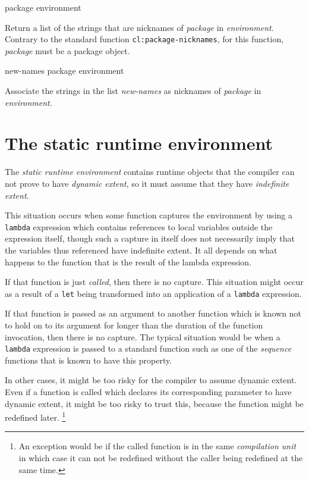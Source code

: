  {package environment}

Return a list of the strings that are nicknames of \textit{package} in
\textit{environment}.  Contrary to the standard \commonlisp{} function
\texttt{cl:package-nicknames}, for this function, \textit{package}
must be a package object.

 {new-names package environment}

Associate the strings in the list \textit{new-names} as nicknames of
\textit{package} in \textit{environment}.

\section{The static runtime environment}
\label{sec-environments-static-runtime}

The \emph{static runtime environment} contains runtime objects that
the compiler can not prove to have \emph{dynamic extent}, so it must
assume that they have \emph{indefinite extent}.  

This situation occurs when some function captures the environment by
using a \texttt{lambda} expression which contains references to local
variables outside the expression itself, though such a capture in
itself does not necessarily imply that the variables thus referenced
have indefinite extent.  It all depends on what happens to the
function that is the result of the lambda expression.  

If that function is just \emph{called}, then there is no capture.  This
situation might occur as a result of a \texttt{let} being transformed
into an application of a \texttt{lambda} expression.  

If that function is passed as an argument to another function which is
known not to hold on to its argument for longer than the duration of
the function invocation, then there is no capture.  The typical
situation would be when a \texttt{lambda} expression is passed to a
standard \commonlisp{} function such as one of the \emph{sequence} functions
that is known to have this property.  

In other cases, it might be too risky for the compiler to assume
dynamic extent.  Even if a function is called which declares its
corresponding parameter to have dynamic extent, it might be too risky
to trust this, because the function might be redefined later.%
\footnote{An exception would be if the called function is in the same
  \emph{compilation unit} in which case it can not be redefined
  without the caller being redefined at the same time.}

